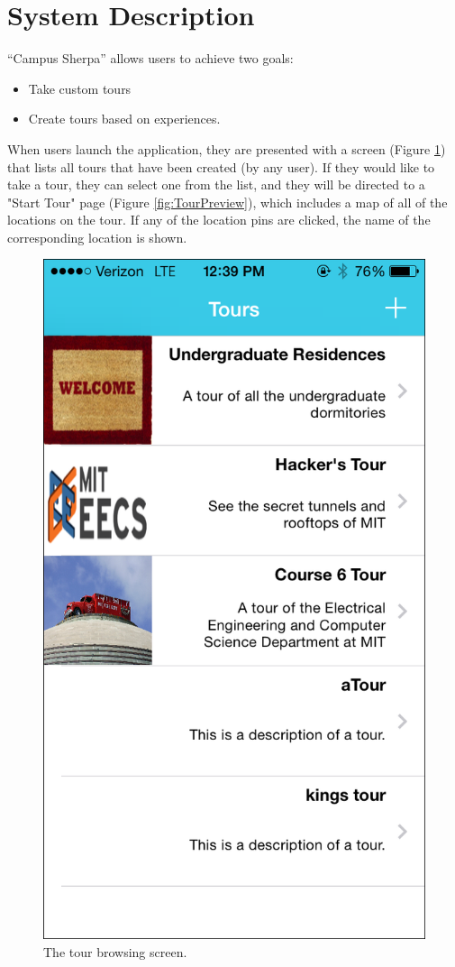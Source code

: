 \documentclass{sigchi}
\begin{document}
\section{System Description}

``Campus Sherpa'' allows users to achieve two goals: 

\begin{itemize}
	\item Take custom tours
	\item Create tours based on experiences.
\end{itemize}

When users launch the application, they are presented with a screen (Figure \ref{fig:TourBrowser}) that lists all tours that have been created (by any user). If they would like to take a tour, they can select one from the list, and they will be directed to a "Start Tour" page (Figure \ref{fig:TourPreview}), which includes a map of all of the locations on the tour. If any of the location pins are clicked, the name of the corresponding location is shown.

\begin{figure}
\centering
\includegraphics[width=0.7\linewidth]{./TourBrowser}
\caption{The tour browsing screen.}
\label{fig:TourBrowser}
\end{figure}
\end{document}
